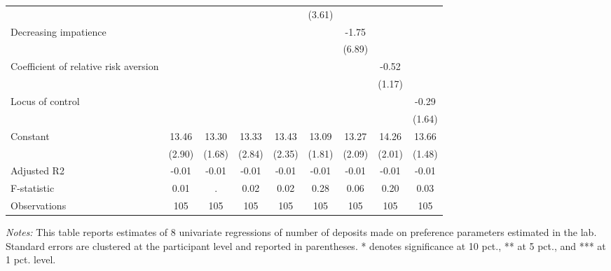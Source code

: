 \begin{table}[h]
{\begin{threeparttable}
\begin{tabular}{l*{8}{c}}
                &                  &                  &                  &                  &   (3.61)         &                  &                  &                  \\
Decreasing impatience&                  &                  &                  &                  &                  &    -1.75         &                  &                  \\
                &                  &                  &                  &                  &                  &   (6.89)         &                  &                  \\
Coefficient of relative risk aversion&                  &                  &                  &                  &                  &                  &    -0.52         &                  \\
                &                  &                  &                  &                  &                  &                  &   (1.17)         &                  \\
Locus of control&                  &                  &                  &                  &                  &                  &                  &    -0.29         \\
                &                  &                  &                  &                  &                  &                  &                  &   (1.64)         \\
Constant        &    13.46\sym{***}&    13.30\sym{***}&    13.33\sym{***}&    13.43\sym{***}&    13.09\sym{***}&    13.27\sym{***}&    14.26\sym{***}&    13.66\sym{***}\\
                &   (2.90)         &   (1.68)         &   (2.84)         &   (2.35)         &   (1.81)         &   (2.09)         &   (2.01)         &   (1.48)         \\
\midrule
Adjusted R2     &    -0.01         &    -0.01         &    -0.01         &    -0.01         &    -0.01         &    -0.01         &    -0.01         &    -0.01         \\
F-statistic     &     0.01         &        .         &     0.02         &     0.02         &     0.28         &     0.06         &     0.20         &     0.03         \\
Observations    &      105         &      105         &      105         &      105         &      105         &      105         &      105         &      105         \\
\bottomrule \end{tabular} \begin{tablenotes}[flushleft] \footnotesize \item \emph{Notes:} This table reports estimates of 8 univariate regressions of number of deposits made on preference parameters estimated in the lab. Standard errors are clustered at the participant level and reported in parentheses. * denotes significance at 10 pct., ** at 5 pct., and *** at 1 pct. level. \end{tablenotes} \end{threeparttable} } \end{table}
